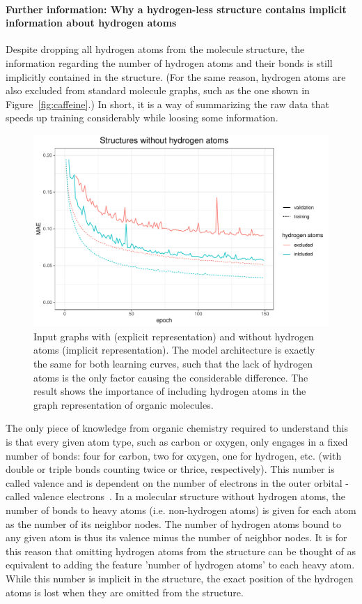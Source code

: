 \paragraph*{Further information: Why a hydrogen-less structure contains implicit information about hydrogen atoms}
Despite dropping all hydrogen atoms from the molecule structure, the information regarding the number of hydrogen atoms and their bonds is still implicitly contained in the structure. (For the same reason, hydrogen atoms are also excluded from standard molecule graphs, such as the one shown in Figure~\ref{fig:caffeine}.) In short, it is a way of summarizing the raw data that speeds up training considerably while loosing some information.

\begin{figure}[H]
	\includegraphics[width=\linewidth]{figures/implict-hydrogens.pdf}
	\caption{Input graphs with (explicit representation) and without hydrogen atoms (implicit representation). The model architecture is exactly the same for both learning curves, such that the lack of hydrogen atoms is the only factor causing the considerable difference. The result shows the importance of including hydrogen atoms in the graph representation of organic molecules.}
	\label{fig:implicit-hydrogens}
\end{figure}

The only piece of knowledge from organic chemistry required to understand this is that every given atom type, such as carbon or oxygen, only engages in a fixed number of bonds: four for carbon, two for oxygen, one for hydrogen, etc. (with double or triple bonds counting twice or thrice, respectively). This number is called valence and is dependent on the number of electrons in the outer orbital - called valence electrons~\cite{Organic-chemistry}. In a molecular structure without hydrogen atoms, the number of bonds to heavy atoms (i.e. non-hydrogen atoms) is given for each atom as the number of its neighbor nodes. The number of hydrogen atoms bound to any given atom is thus its valence minus the number of neighbor nodes. It is for this reason that omitting hydrogen atoms from the structure can be thought of as equivalent to adding the feature 'number of hydrogen atoms' to each heavy atom. While this number is implicit in the structure, the exact position of the hydrogen atoms is lost when they are omitted from the structure.



